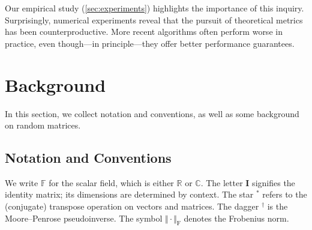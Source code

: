 \documentclass[final]{siamart1116}
\numberwithin{equation}{section}
\numberwithin{theorem}{section}
\numberwithin{figure}{section}
\newcommand{\R}{\mathbb{R}}
\newcommand{\C}{\mathbb{C}}
\newcommand{\F}{\mathbb{F}}
\newcommand{\Id}{\mathbf{I}}
\newcommand{\norm}[1]{\Vert #1 \Vert}
\newcommand{\fnorm}[1]{\norm{#1}_{\mathrm{F}}}
\begin{document}
Our empirical study (\cref{sec:experiments}) highlights
the importance of this inquiry.
Surprisingly, numerical experiments reveal that the
pursuit of theoretical metrics has been counterproductive.
More recent algorithms often perform worse in practice,
even though---in principle---they offer better
performance guarantees. 


































































\section{Background}

In this section, we collect notation and conventions,
as well as some background on random matrices.


\subsection{Notation and Conventions}

We write $\F$ for the scalar field, which is either $\R$ or $\C$.
The letter $\Id$ signifies the identity matrix; its dimensions are determined by context.
The star ${}^*$ refers to the (conjugate) transpose operation on vectors and matrices.
The dagger ${}^\dagger$ is the Moore--Penrose pseudoinverse.
The symbol $\fnorm{\cdot}$ denotes the Frobenius norm.
\end{document}
